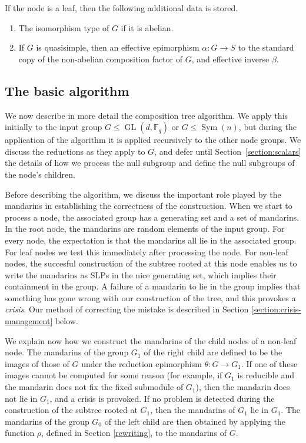 \documentclass[12pt,twoside,reqno,psamsfonts]{amsproc}
\newcommand{\comment}[1]{\marginpar{\begin{center}\scriptsize{#1}\end{center}}}
\newcommand{\nullsubgp}{{null subgroup}\xspace}
\numberwithin{equation}{section}
\numberwithin{figure}{section}
\newcounter{algorithm}
\theoremstyle{plain}
\theoremstyle{definition}
\theoremstyle{remark}
\providecommand{\Sym}[1]{\operatorname{Sym}( #1 )}
\newcommand{\field}[1]{\mathbb{#1}}
\newcommand{\F}{\field{F}}
\DeclareMathOperator{\GL}{GL}
\begin{document}
If the node is a leaf, then the following additional data is stored.
\begin{enumerate}
\item The isomorphism type of $G$ if it is abelian. 

\item If $G$ is quasisimple, then an effective 
epimorphism $\alpha : G \to S$ to the standard
copy of the non-abelian composition factor of $G$, and 
effective inverse $\beta$.
\end{enumerate}

\subsection{The basic algorithm}\label{section:general}
We now describe in more detail the composition tree algorithm. 
We apply this initially to the input group $G \leqslant \GL(d,\F_q)$ 
or $G \leqslant \Sym{n}$,
but during the application of the algorithm 
it is applied recursively to the other node groups. 
We discuss the reductions as they apply to $G$,
and defer until Section~\ref{section:scalars} the details of 
how we process
the \nullsubgp and define the {\nullsubgp}s of the node's children.

Before describing the algorithm, we discuss the important
\comment{DFH: I have rewritten the two paragraphs on mandarins}
role played by the mandarins in establishing the correctness
of the construction.
When we start to process a node, the associated
group has a generating set and a set of mandarins. 
In the root node, the mandarins are random elements of the input group. 
For every node, the expectation is that the mandarins all lie in the 
associated group. For leaf nodes we test this immediately after
processing the node. For non-leaf nodes, the succesful construction of the
subtree rooted at this node enables us to write the mandarins as SLPs in the
nice generating set, which implies their containment in the group. 
A failure of a mandarin to lie in the group implies that something has gone
wrong with our construction of the tree, and this provokes a {\em crisis}.
Our method of correcting the mistake is described in Section
\ref{section:crisis-management} below.

We explain now how we construct the mandarins of the child nodes
of a non-leaf node.
The mandarins of the group $G_1$ of the right child are defined to be
the images of those of $G$ under the reduction epimorphism $\theta:G \to G_1$.
If one of these images cannot be computed for some reason
(for example, if $G_1$ is reducible and the mandarin does not fix the fixed
submodule of $G_1$), then the mandarin does not lie in $G_1$,
and a crisis is provoked.
If no problem is detected during the construction of the
subtree rooted at $G_1$, then the mandarins of $G_1$ lie in $G_1$.
The mandarins of the group $G_0$ of the left child are then obtained by
applying the function $\rho$, defined in Section \ref{rewriting},
to the mandarins of $G$.
\end{document}
